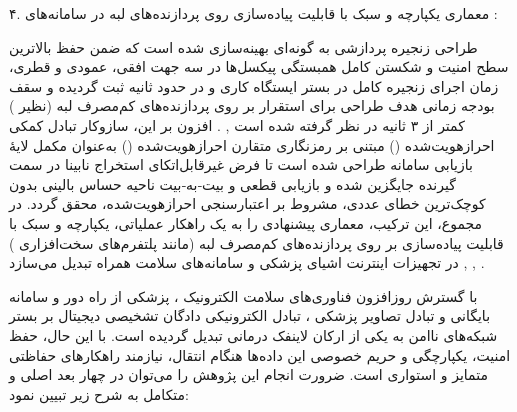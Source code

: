 

۴. معماری یکپارچه و سبک با قابلیت پیاده‌سازی روی پردازنده‌های لبه  در سامانه‌های :\par

طراحی زنجیره پردازشی به گونه‌ای بهینه‌سازی شده است که ضمن حفظ بالاترین سطح امنیت و شکستن کامل همبستگی پیکسل‌ها در سه جهت افقی، عمودی و قطری، زمان اجرای زنجیره کامل در بستر ایستگاه کاری و  در حدود  ثانیه ثبت گردیده و سقف بودجه زمانی هدف طراحی برای استقرار بر روی پردازنده‌های کم‌مصرف لبه (نظیر ) کمتر از ۳ ثانیه در نظر گرفته شده است , . افزون بر این، سازوکار تبادل کمکی احرازهویت‌شده () مبتنی بر رمزنگاری متقارن احرازهویت‌شده () به‌عنوان مکمل لایهٔ بازیابی سامانه طراحی شده است تا فرض غیرقابل‌اتکای استخراج نابینا در سمت گیرنده جایگزین شده و بازیابی قطعی و بیت‑به‑بیت ناحیه حساس بالینی بدون کوچک‌ترین خطای عددی، مشروط بر اعتبارسنجی احرازهویت‌شده، محقق گردد. در مجموع، این ترکیب، معماری پیشنهادی را به یک راهکار عملیاتی، یکپارچه و سبک با قابلیت پیاده‌سازی بر روی پردازنده‌های کم‌مصرف لبه (مانند پلتفرم‌های سخت‌افزاری ) در تجهیزات اینترنت اشیای پزشکی  و سامانه‌های سلامت همراه تبدیل می‌سازد , , .\par





با گسترش روزافزون فناوری‌های سلامت الکترونیک ، پزشکی از راه دور  و سامانه بایگانی و تبادل تصاویر پزشکی ، تبادل الکترونیکی دادگان تشخیصی دیجیتال بر بستر شبکه‌های ناامن به یکی از ارکان لاینفک درمانی تبدیل گردیده است. با این حال، حفظ امنیت، یکپارچگی و حریم خصوصی این داده‌ها هنگام انتقال، نیازمند راهکارهای حفاظتی متمایز و استواری است. ضرورت انجام این پژوهش را می‌توان در چهار بعد اصلی و متکامل به شرح زیر تبیین نمود:\par



